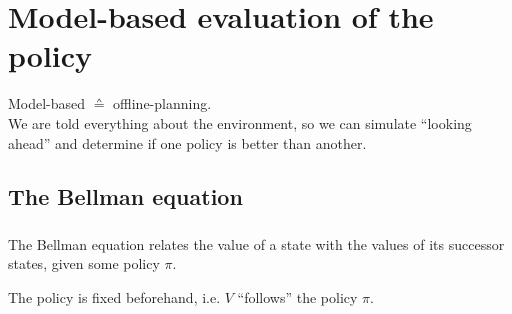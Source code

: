 \section{Model-based evaluation of the policy}

\begin{frame} 
    \begin{center} 
    Model-based $\corresponds$ offline-planning.\\
    We are told everything about the environment, so we can simulate ``looking ahead'' and determine if one policy is better than another.
    \end{center}
\end{frame}

\subsection{The Bellman equation}

\begin{frame}\frametitle{\subsecname}

The Bellman equation relates the value of a state with the values of its successor states, given some policy $\pi$.

The policy is fixed beforehand, i.e. $V$ ``follows'' the policy $\pi$.

\end{frame}

